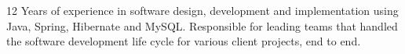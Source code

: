 

\begin{cvparagraph}

    12 Years of experience in software design, development and implementation using Java, Spring, Hibernate and MySQL. Responsible for leading teams that handled the software development life cycle for various client projects, end to end.
\end{cvparagraph}

